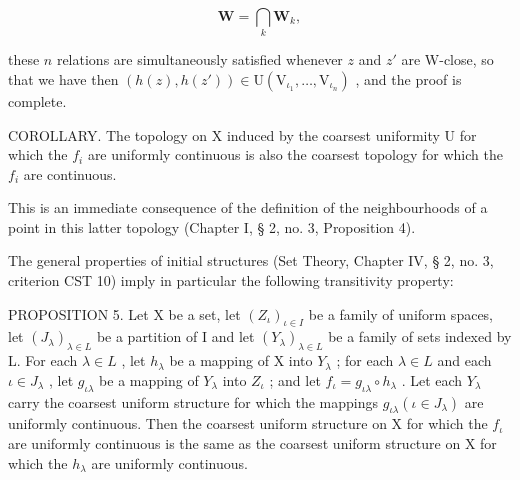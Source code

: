 \[
\mathbf {W} = \bigcap_ {k} \mathbf {W} _ {k},
\]

these \(n\) relations are simultaneously satisfied whenever \(z\) and \(z'\) are W-close, so that we have then \((h(z), h(z')) \in \mathrm{U}(\mathrm{V}_{\iota_1}, \ldots, \mathrm{V}_{\iota_n})\) , and the proof is complete.

COROLLARY. The topology on X induced by the coarsest uniformity U for which the \(f_{i}\) are uniformly continuous is also the coarsest topology for which the \(f_{i}\) are continuous.

This is an immediate consequence of the definition of the neighbourhoods of a point in this latter topology (Chapter I, § 2, no. 3, Proposition 4).

The general properties of initial structures (Set Theory, Chapter IV, § 2, no. 3, criterion CST 10) imply in particular the following transitivity property:

PROPOSITION 5. Let X be a set, let \((Z_{\iota})_{\iota \in I}\) be a family of uniform spaces, let \((J_{\lambda})_{\lambda \in L}\) be a partition of I and let \((Y_{\lambda})_{\lambda \in L}\) be a family of sets indexed by L. For each \(\lambda \in L\) , let \(h_{\lambda}\) be a mapping of X into \(Y_{\lambda}\) ; for each \(\lambda \in L\) and each \(\iota \in J_{\lambda}\) , let \(g_{\iota \lambda}\) be a mapping of \(Y_{\lambda}\) into \(Z_{\iota}\) ; and let \(f_{\iota} = g_{\iota \lambda} \circ h_{\lambda}\) . Let each \(Y_{\lambda}\) carry the coarsest uniform structure for which the mappings \(g_{\iota \lambda} (\iota \in J_{\lambda})\) are uniformly continuous. Then the coarsest uniform structure on X for which the \(f_{\iota}\) are uniformly continuous is the same as the coarsest uniform structure on X for which the \(h_{\lambda}\) are uniformly continuous.

